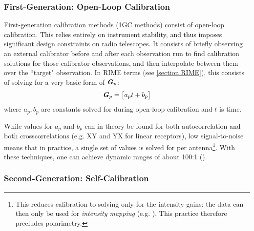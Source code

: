 \subsubsection{First-Generation: Open-Loop Calibration}\label{section.calibration.1gc}

\pg
First-generation calibration methods (1GC methods) consist of open-loop calibration. This relies entirely on instrument stability, and thus imposes significant design constraints on radio telescopes. It consists of briefly observing an external calibrator before and after each observation run to find calibration solutions for those calibrator observations, and then interpolate between them over the ``target" observation. %
In RIME terms (see \cref{section.RIME}), this consists of solving for a very basic form of $\textbf{\emph{G}}_p$:
\begin{equation}
\Gjones_p = \begin{bmatrix} a_p t + b_p \end{bmatrix} %
\end{equation}
where $a_p,b_p$ are constants solved for during open-loop calibration and $t$ is time. %

\pg
While values for $a_p$ and $b_p$ can in theory be found for both autocorrelation and both crosscorrelations (e.g. XY and YX for linear receptors), low signal-to-noise means that in practice, a single set of values is solved for per antenna\footnote{This reduces calibration to solving only for the intensity gains: the data can then only be used for \emph{intensity mapping} (e.g. ). This practice therefore precludes polarimetry.}. With these techniques, one can achieve dynamic ranges of about 100:1 ().

\subsubsection{Second-Generation: Self-Calibration}\label{section.calibration.2gc}


